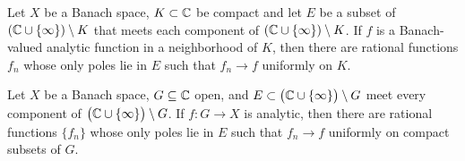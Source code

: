 \begin{theorem}
	Let $X$ be a Banach space, $K \subset \mathbb{C}$ be compact and let $E$ be a subset of $\left(\mathbb{C} \cup \{\infty\}\right)\setminus K$ that meets each component of $\left(	\mathbb{C} \cup \{\infty\}\right) \setminus K$. If $f$ is a Banach-valued analytic function in a neighborhood of $K$, then there are rational functions $f_n$ whose only poles lie in $E$ such that $f_n \rightarrow f$ uniformly on $K$.
\end{theorem}

\begin{theorem}
	Let $X$ be a Banach space, $G \subseteq \mathbb{C}$ open, and $E \subset \bigl( \mathbb{C} \cup \{\infty\}\bigr) \setminus G$ meet every component of $\bigl( \mathbb{C} \cup \{\infty\} \bigr) \setminus G$. If $f:G \rightarrow X$ is analytic, then there are rational functions $\{f_n\}$ whose only poles lie in $E$ such that $f_n \rightarrow f$ uniformly on compact subsets of $G$.
\end{theorem}

